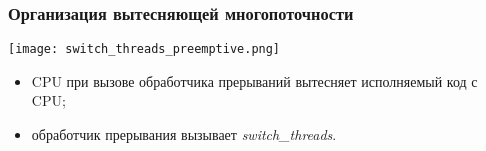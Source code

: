 \begin{frame}
\frametitle{Организация вытесняющей многопоточности}
\begin{center}
  \texttt{[image: switch\_threads\_preemptive.png]}
\end{center}
\begin{itemize}
  \item CPU при вызове обработчика прерываний вытесняет исполняемый код с CPU;
  \item обработчик прерывания вызывает \emph{switch\_threads}.
\end{itemize}
\end{frame}
